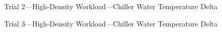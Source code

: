 \documentclass[10pt]{report}
\begin{document}
\begin{landscape}
\begin{figure}[!h]
    \caption{Trial 2---High-Density Workload---Chiller Water Temperature Delta}
\end{figure}
\begin{figure}[!h]
  \centering

    \caption{Trial 3---High-Density Workload---Chiller Water Temperature Delta}
\end{figure}

\end{landscape}


\clearpage



\end{document}
